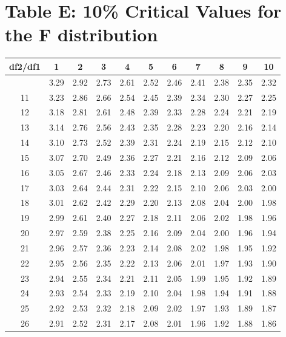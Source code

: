 \documentclass[
]{book}
\theoremstyle{definition}
\theoremstyle{definition}
\theoremstyle{definition}
\theoremstyle{definition}
\theoremstyle{remark}
\begin{document}
\hypertarget{table-e-10-critical-values-for-the-f-distribution}{%
\section*{Table E: 10\% Critical Values for the F distribution}\label{table-e-10-critical-values-for-the-f-distribution}}

\begin{longtable}[]{@{}ccccccccccc@{}}
\toprule\noalign{}
df2/df1 & 1 & 2 & 3 & 4 & 5 & 6 & 7 & 8 & 9 & 10 \\
\midrule\noalign{}
\endhead
\bottomrule\noalign{}
\endlastfoot
10 & 3.29 & 2.92 & 2.73 & 2.61 & 2.52 & 2.46 & 2.41 & 2.38 & 2.35 & 2.32 \\
11 & 3.23 & 2.86 & 2.66 & 2.54 & 2.45 & 2.39 & 2.34 & 2.30 & 2.27 & 2.25 \\
12 & 3.18 & 2.81 & 2.61 & 2.48 & 2.39 & 2.33 & 2.28 & 2.24 & 2.21 & 2.19 \\
13 & 3.14 & 2.76 & 2.56 & 2.43 & 2.35 & 2.28 & 2.23 & 2.20 & 2.16 & 2.14 \\
14 & 3.10 & 2.73 & 2.52 & 2.39 & 2.31 & 2.24 & 2.19 & 2.15 & 2.12 & 2.10 \\
15 & 3.07 & 2.70 & 2.49 & 2.36 & 2.27 & 2.21 & 2.16 & 2.12 & 2.09 & 2.06 \\
16 & 3.05 & 2.67 & 2.46 & 2.33 & 2.24 & 2.18 & 2.13 & 2.09 & 2.06 & 2.03 \\
17 & 3.03 & 2.64 & 2.44 & 2.31 & 2.22 & 2.15 & 2.10 & 2.06 & 2.03 & 2.00 \\
18 & 3.01 & 2.62 & 2.42 & 2.29 & 2.20 & 2.13 & 2.08 & 2.04 & 2.00 & 1.98 \\
19 & 2.99 & 2.61 & 2.40 & 2.27 & 2.18 & 2.11 & 2.06 & 2.02 & 1.98 & 1.96 \\
20 & 2.97 & 2.59 & 2.38 & 2.25 & 2.16 & 2.09 & 2.04 & 2.00 & 1.96 & 1.94 \\
21 & 2.96 & 2.57 & 2.36 & 2.23 & 2.14 & 2.08 & 2.02 & 1.98 & 1.95 & 1.92 \\
22 & 2.95 & 2.56 & 2.35 & 2.22 & 2.13 & 2.06 & 2.01 & 1.97 & 1.93 & 1.90 \\
23 & 2.94 & 2.55 & 2.34 & 2.21 & 2.11 & 2.05 & 1.99 & 1.95 & 1.92 & 1.89 \\
24 & 2.93 & 2.54 & 2.33 & 2.19 & 2.10 & 2.04 & 1.98 & 1.94 & 1.91 & 1.88 \\
25 & 2.92 & 2.53 & 2.32 & 2.18 & 2.09 & 2.02 & 1.97 & 1.93 & 1.89 & 1.87 \\
26 & 2.91 & 2.52 & 2.31 & 2.17 & 2.08 & 2.01 & 1.96 & 1.92 & 1.88 & 1.86 \\

\end{longtable}
\end{document}
